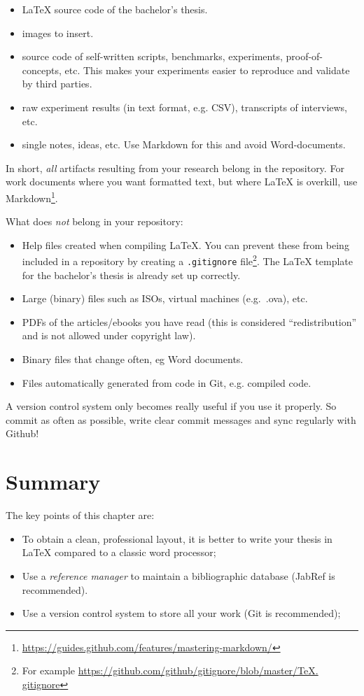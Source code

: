 \begin{itemize}
    \item \LaTeX{} source code of the bachelor's thesis.
    \item images to insert.
    \item source code of self-written scripts, benchmarks, experiments, proof-of-concepts, etc. This makes your experiments easier to reproduce and validate by third parties.
    \item raw experiment results (in text format, e.g. CSV), transcripts of interviews, etc.
    \item single notes, ideas, etc. Use Markdown for this and avoid Word-do\-cu\-ments.  
\end{itemize}

In short, \emph{all} artifacts resulting from your research belong in the repository. For work documents where you want formatted text, but where \LaTeX{} is overkill, use Markdown\footnote{\url{https://guides.github.com/features/mastering-markdown/}}.

What does \emph{not} belong in your repository:

\begin{itemize}
    \item Help files created when compiling \LaTeX{}. You can prevent these from being included in a repository by creating a \texttt{.gitignore} file\footnote{For example \url{https://github.com/github/gitignore/blob/master/TeX. gitignore}}. The \LaTeX{} template for the bachelor's thesis is already set up correctly.
    \item Large (binary) files such as ISOs, virtual machines (e.g.\ .ova), etc.
    \item PDFs of the articles/ebooks you have read (this is considered ``redistribution'' and is not allowed under copyright law).
    \item Binary files that change often, eg Word documents.
    \item Files automatically generated from code in Git, e.g. compiled code.    
\end{itemize}

A version control system only becomes really useful if you use it properly. So commit as often as possible, write clear commit messages and sync regularly with Github!

\section{Summary}
\label{sec:preparation-summary}

The key points of this chapter are:

\begin{itemize}
    \item To obtain a clean, professional layout, it is better to write your thesis in {\LaTeX} compared to a classic word processor;
    \item Use a \emph{reference manager} to maintain a bibliographic database (JabRef is recommended).
    \item Use a version control system to store all your work (Git is recommended);
\end{itemize}

